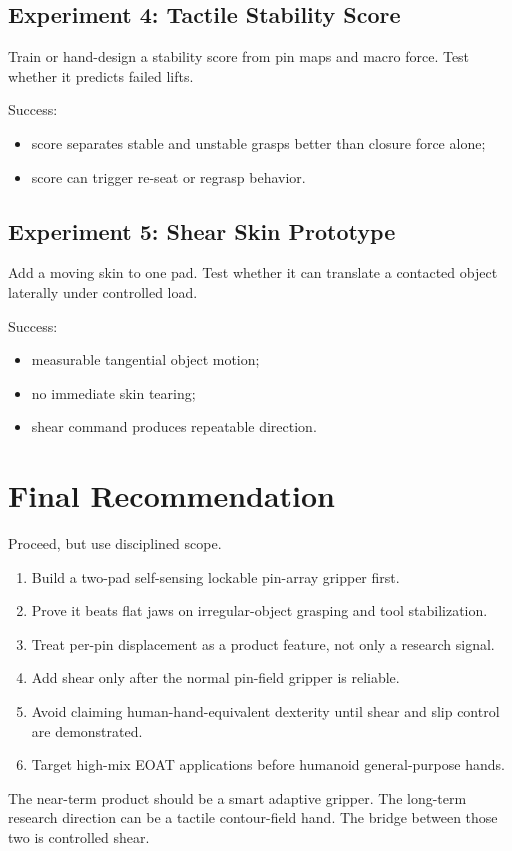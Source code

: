 \documentclass[11pt]{article}
\begin{document}
\subsection{Experiment 4: Tactile Stability Score}

Train or hand-design a stability score from pin maps and macro force. Test whether it predicts failed lifts.

Success:

\begin{itemize}[leftmargin=*]
  \item score separates stable and unstable grasps better than closure force alone;
  \item score can trigger re-seat or regrasp behavior.
\end{itemize}

\subsection{Experiment 5: Shear Skin Prototype}

Add a moving skin to one pad. Test whether it can translate a contacted object laterally under controlled load.

Success:

\begin{itemize}[leftmargin=*]
  \item measurable tangential object motion;
  \item no immediate skin tearing;
  \item shear command produces repeatable direction.
\end{itemize}

\section{Final Recommendation}

Proceed, but use disciplined scope.

\begin{enumerate}[leftmargin=*]
  \item Build a two-pad self-sensing lockable pin-array gripper first.
  \item Prove it beats flat jaws on irregular-object grasping and tool stabilization.
  \item Treat per-pin displacement as a product feature, not only a research signal.
  \item Add shear only after the normal pin-field gripper is reliable.
  \item Avoid claiming human-hand-equivalent dexterity until shear and slip control are demonstrated.
  \item Target high-mix EOAT applications before humanoid general-purpose hands.
\end{enumerate}

The near-term product should be a smart adaptive gripper. The long-term research direction can be a tactile contour-field hand. The bridge between those two is controlled shear.



\end{document}
